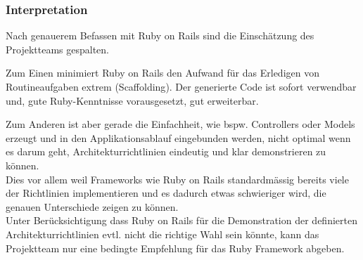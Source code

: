 \subsubsection*{Interpretation}
Nach genauerem Befassen mit Ruby on Rails sind die Einschätzung des Projektteams gespalten.

Zum Einen minimiert Ruby on Rails den Aufwand für das Erledigen von Routineaufgaben extrem (\gls{Scaffolding}). Der generierte Code ist sofort verwendbar und, gute Ruby-Kenntnisse vorausgesetzt, gut erweiterbar.

Zum Anderen ist aber gerade die Einfachheit, wie bspw. Controllers oder Models erzeugt und in den Applikationsablauf eingebunden werden, nicht optimal wenn es darum geht, Architekturrichtlinien eindeutig und klar demonstrieren zu können.\\
Dies vor allem weil Frameworks wie Ruby on Rails standardmässig bereits viele der Richtlinien implementieren und es dadurch etwas schwieriger wird, die genauen Unterschiede zeigen zu können.\\

Unter Berücksichtigung dass Ruby on Rails für die Demonstration der definierten Architekturrichtlinien evtl. nicht die richtige Wahl sein könnte, kann das Projektteam nur eine bedingte Empfehlung für das Ruby Framework abgeben.